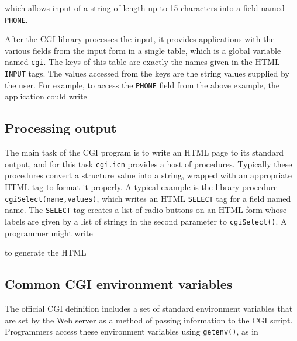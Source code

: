 {

\noindent
which allows input of a string of length up to 15 characters into a
field named \texttt{PHONE}.

After the CGI library processes the input, it provides applications with
the various fields from the input form in a single table, which is a
global variable named \texttt{cgi}. The keys of this table are exactly
the names given in the HTML \texttt{INPUT} tags. The values accessed
from the keys are the string values supplied by the user. For example,
to access the \texttt{PHONE} field from the above example, the
application could write 


\subsection*{Processing output}

The main task of the CGI program is to write an HTML page to its
standard output, and for this task \texttt{cgi.icn} provides a host of
procedures. Typically these procedures convert a structure value into a
string, wrapped with an appropriate HTML tag to format it properly. A
typical example is the library procedure
\texttt{cgiSelect(name,values)}, which writes an HTML \texttt{SELECT}
tag for a field named name. The \texttt{SELECT} tag creates a list of
radio buttons on an HTML form whose labels are given by a list of
strings in the second parameter to \texttt{cgiSelect()}. A programmer
might write


\noindent to generate the HTML


\subsection*{Common CGI environment variables}

The official CGI definition includes a set
of standard environment
variables that are set by the Web server as a method of passing
information to the CGI script. Programmers access these environment
variables using \texttt{getenv()}, as in

}
